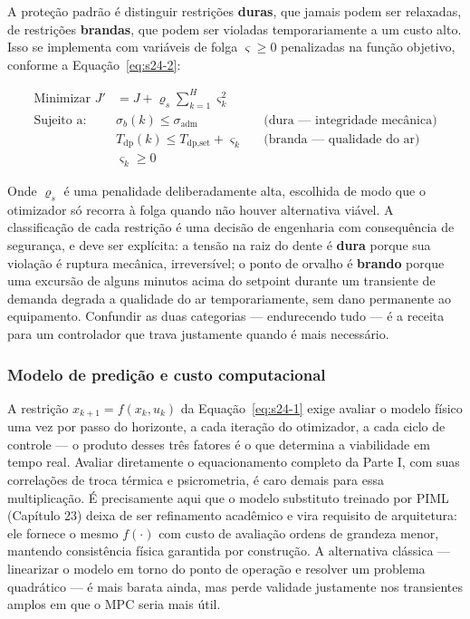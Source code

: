 \documentclass[12pt,a4paper]{article}
\numberwithin{equation}{section}
\numberwithin{table}{section}
\numberwithin{figure}{section}
\begin{document}
{	A proteção padrão é distinguir restrições \textbf{duras}, que jamais podem ser relaxadas, de restrições \textbf{brandas}, que podem ser violadas temporariamente a um custo alto. Isso se implementa com variáveis de folga $\varsigma \ge 0$ penalizadas na função objetivo, conforme a Equação~\eqref{eq:s24-2}:

	\begin{equation}\label{eq:s24-2}
	\begin{aligned}
		\text{Minimizar } J' &= J + \varrho_s \sum_{k=1}^{H} \varsigma_k^2 \\[4pt]
		\text{Sujeito a: } & \sigma_b(k) \le \sigma_{\text{adm}} && \text{(dura — integridade mecânica)} \\
		& T_{\text{dp}}(k) \le T_{\text{dp,set}} + \varsigma_k && \text{(branda — qualidade do ar)} \\
		& \varsigma_k \ge 0
	\end{aligned}
\end{equation}

	Onde $\varrho_s$ é uma penalidade deliberadamente alta, escolhida de modo que o otimizador só recorra à folga quando não houver alternativa viável. A classificação de cada restrição é uma decisão de engenharia com consequência de segurança, e deve ser explícita: a tensão na raiz do dente é \textbf{dura} porque sua violação é ruptura mecânica, irreversível; o ponto de orvalho é \textbf{brando} porque uma excursão de alguns minutos acima do setpoint durante um transiente de demanda degrada a qualidade do ar temporariamente, sem dano permanente ao equipamento. Confundir as duas categorias — endurecendo tudo — é a receita para um controlador que trava justamente quando é mais necessário.

	\subsubsection*{Modelo de predição e custo computacional}

	A restrição $x_{k+1} = f(x_k, u_k)$ da Equação~\eqref{eq:s24-1} exige avaliar o modelo físico uma vez por passo do horizonte, a cada iteração do otimizador, a cada ciclo de controle — o produto desses três fatores é o que determina a viabilidade em tempo real. Avaliar diretamente o equacionamento completo da Parte I, com suas correlações de troca térmica e psicrometria, é caro demais para essa multiplicação. É precisamente aqui que o modelo substituto treinado por PIML (Capítulo 23) deixa de ser refinamento acadêmico e vira requisito de arquitetura: ele fornece o mesmo $f(\cdot)$ com custo de avaliação ordens de grandeza menor, mantendo consistência física garantida por construção. A alternativa clássica — linearizar o modelo em torno do ponto de operação e resolver um problema quadrático — é mais barata ainda, mas perde validade justamente nos transientes amplos em que o MPC seria mais útil.

}
\end{document}

